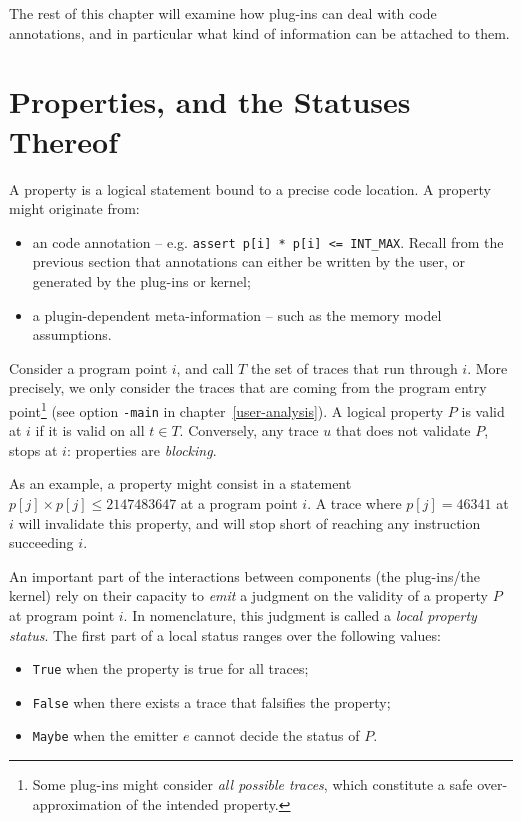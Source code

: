 The rest of this chapter will examine how plug-ins can deal with code
annotations, and in particular what kind of information can be attached to
them.

\section{Properties, and the Statuses Thereof}

A property is a logical statement bound to a precise code location. A property
might originate from:
\begin{itemize}
\item an \acsl code annotation -- e.g. \verb+assert p[i] * p[i] <= INT_MAX+.
Recall from the previous section that annotations can either be written by the
user, or generated by the \FramaC plug-ins or kernel;
\item a plugin-dependent meta-information -- such as the memory model assumptions.
\end{itemize}

Consider a program point $i$, and call $T$ the set of traces that run through
$i$. More precisely, we only consider the traces that are coming from the
program entry point\footnote{Some plug-ins might consider \emph{all possible
traces}, which constitute a safe over-approximation of the intended property.}
(see option \verb+-main+ in chapter~\ref{user-analysis}).  A logical property
$P$ is valid at $i$ if it is valid on all $t\in T$. Conversely, any trace $u$
that does not validate $P$, stops at $i$: properties are \emph{blocking}.

As an example, a property might consist in a statement $p[j]\times p[j] \leq 2
147 483 647$ at a program point $i$. A trace where $p[j]=46341$ at $i$
will invalidate this property, and will stop short of reaching any instruction
succeeding $i$.

An important part of the interactions between \FramaC components (the
plug-ins/the kernel) rely on their capacity to \emph{emit} a judgment on the
validity of a property $P$ at program point $i$. In \FramaC nomenclature, this
judgment is called a \emph{local property status}. The first part of a local
status ranges over the following values:

\begin{itemize}
\item \verb+True+ when the property is true for all traces;
\item \verb+False+ when there exists a trace that falsifies the property;
\item \verb+Maybe+ when the emitter $e$ cannot decide the status of $P$.
\end{itemize}

